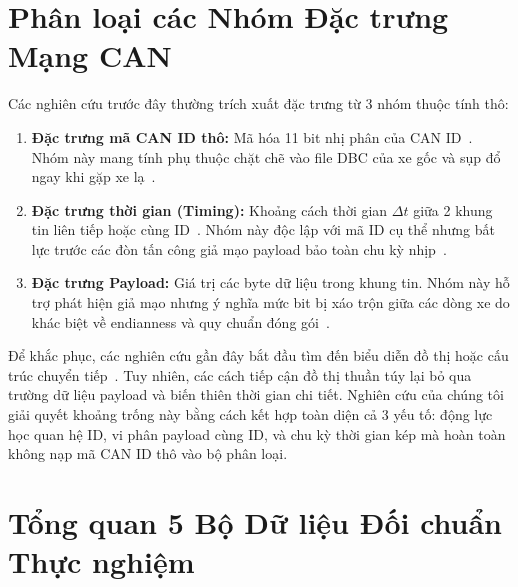 \documentclass[12pt, a4paper, reqno, oneside]{book}
\begin{document}
\section{Phân loại các Nhóm Đặc trưng Mạng CAN}
\label{subsec:feature_structural}

Các nghiên cứu trước đây thường trích xuất đặc trưng từ 3 nhóm thuộc tính thô:
\begin{enumerate}
    \item \textbf{Đặc trưng mã CAN ID thô:} Mã hóa 11 bit nhị phân của CAN ID~\cite{song2020invehicle}. Nhóm này mang tính phụ thuộc chặt chẽ vào file DBC của xe gốc và sụp đổ ngay khi gặp xe lạ~\cite{lampe2024curated}.
    \item \textbf{Đặc trưng thời gian (Timing):} Khoảng cách thời gian $\Delta t$ giữa 2 khung tin liên tiếp hoặc cùng ID~\cite{lee2017otids,taylor2016anomaly}. Nhóm này độc lập với mã ID cụ thể nhưng bất lực trước các đòn tấn công giả mạo payload bảo toàn chu kỳ nhịp~\cite{dupont2019automotive}.
    \item \textbf{Đặc trưng Payload:} Giá trị các byte dữ liệu trong khung tin. Nhóm này hỗ trợ phát hiện giả mạo nhưng ý nghĩa mức bit bị xáo trộn giữa các dòng xe do khác biệt về endianness và quy chuẩn đóng gói~\cite{lampe2024curated}.
\end{enumerate}

Để khắc phục, các nghiên cứu gần đây bắt đầu tìm đến biểu diễn đồ thị hoặc cấu trúc chuyển tiếp~\cite{islam2020graph,meng2023gbids}. Tuy nhiên, các cách tiếp cận đồ thị thuần túy lại bỏ qua trường dữ liệu payload và biến thiên thời gian chi tiết. Nghiên cứu của chúng tôi giải quyết khoảng trống này bằng cách kết hợp toàn diện cả 3 yếu tố: động lực học quan hệ ID, vi phân payload cùng ID, và chu kỳ thời gian kép mà hoàn toàn không nạp mã CAN ID thô vào bộ phân loại.

\section{Tổng quan 5 Bộ Dữ liệu Đối chuẩn Thực nghiệm}
\label{subsec:cross_dataset}
\end{document}
